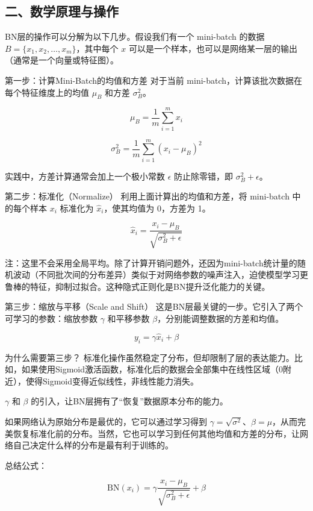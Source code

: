 \hypertarget{ux4e8cux6570ux5b66ux539fux7406ux4e0eux64cdux4f5c}{%
\subsection{二、数学原理与操作}\label{ux4e8cux6570ux5b66ux539fux7406ux4e0eux64cdux4f5c}}

BN层的操作可以分解为以下几步。假设我们有一个 mini-batch 的数据 \(B=\{x_1,x_2,\ldots,x_m\}\)，其中每个 \(x\) 可以是一个样本，也可以是网络某一层的输出（通常是一个向量或特征图）。

第一步：计算Mini-Batch的均值和方差
对于当前 mini-batch，计算该批次数据在每个特征维度上的均值 \(\mu_B\) 和方差 \(\sigma_B^2\)。

\[
\mu_B=\frac{1}{m}\sum_{i=1}^{m}x_i
\]

\[
\sigma_B^2=\frac{1}{m}\sum_{i=1}^{m}(x_i-\mu_B)^2
\]

实践中，方差计算通常会加上一个极小常数 \(\epsilon\) 防止除零错，即 \(\sigma_B^2+\epsilon\)。

第二步：标准化（Normalize）
利用上面计算出的均值和方差，将 mini-batch 中的每个样本 \(x_i\) 标准化为 \(\hat{x}_i\)，使其均值为 0，方差为 1。

\[
\hat{x}_i=\frac{x_i-\mu_B}{\sqrt{\sigma_B^2+\epsilon}}
\]

注：这里不会采用全局平均。除了计算开销问题外，还因为mini-batch统计量的随机波动（不同批次间的分布差异）类似于对网络参数的噪声注入，迫使模型学习更鲁棒的特征，抑制过拟合。这种隐式正则化是BN提升泛化能力的关键。

第三步：缩放与平移（Scale and Shift）
这是BN层最关键的一步。它引入了两个可学习的参数：缩放参数 \(\gamma\) 和平移参数 \(\beta\)，分别能调整数据的方差和均值。

\[
y_i=\gamma\hat{x}_i+\beta
\]

为什么需要第三步？
标准化操作虽然稳定了分布，但却限制了层的表达能力。比如，如果使用Sigmoid激活函数，标准化后的数据会全部集中在线性区域（0附近），使得Sigmoid变得近似线性，非线性能力消失。

\(\gamma\) 和 \(\beta\) 的引入，让BN层拥有了``恢复''数据原本分布的能力。

如果网络认为原始分布是最优的，它可以通过学习得到 \(\gamma=\sqrt{\sigma^2}\)、\(\beta=\mu\)，从而完美恢复标准化前的分布。当然，它也可以学习到任何其他均值和方差的分布，让网络自己决定什么样的分布是最有利于训练的。

总结公式：

\[
\mathrm{BN}(x_i)=\gamma\frac{x_i-\mu_B}{\sqrt{\sigma_B^2+\epsilon}}+\beta
\]

